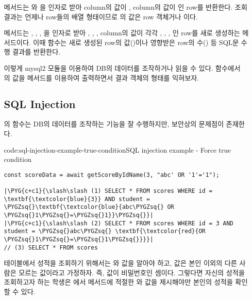  메서드는 와 을 인자로 받아  column의 값이 ,  column의 값이 인 row를 반환한다. 조회 결과는 언제나 row들의 배열 형태이므로 의 값은 row 객체거나 이다.

 메서드는 , , , 을 인자로 받아 , , ,  column의 값이 각각 , , , 인 row를 새로 생성하는 메서드이다. 이때  함수는 새로 생성된 row의  값()이나 영향받은 row의 수() 등 SQL문 수행 결과를 반환한다.

이렇게 mysql2 모듈을 이용하여 DB의 데이터를 조작하거나 읽을 수 있다.  함수에서 의 값을  메서드를 이용하여 출력하면서 결과 객체의 형태를 익혀보자.

\subsection*{SQL Injection}

의  함수는 DB의 데이터를 조작하는 기능을 잘 수행하지만, 보안상의 문제점이 존재한다.

\begin{code}{code:sql-injection-example-true-condition}{SQL injection example - Force true condition}
\begin{verbatim}
const scoreData = await getScoreByIdName(3, "abc' OR '1'='1");

|\PYG{c+c1}{\slash\slash (1) SELECT * FROM scores WHERE id = \textbf{\textcolor{blue}{3}} AND student = \PYGZsq{}\textbf{\textcolor{blue}{abc\PYGZsq{} OR \PYGZsq{}1\PYGZsq{}=\PYGZsq{}1}}\PYGZsq{}}|
|\PYG{c+c1}{\slash\slash (2) SELECT * FROM scores WHERE id = 3 AND student = \PYGZsq{}abc\PYGZsq{} \textbf{\textcolor{red}{OR \PYGZsq{}1\PYGZsq{}=\PYGZsq{}1\PYGZsq{}}}}|
// (3) SELECT * FROM scores
\end{verbatim}
\end{code}

 테이블에서 성적을 조회하기 위해서는 와  값을 알아야 하고,  값은 본인 이외의 다른 사람은 모르는 값이라고 가정하자. 즉,  값이 비밀번호인 셈이다. 그렇다면 자신의 성적을 조회하고자 하는 학생은 에서  메서드에 적절한 와  값을 제시해야만 본인의 성적을 확인할 수 있다.


